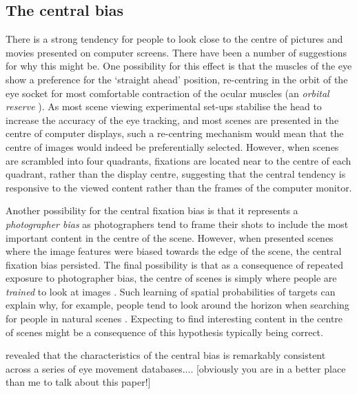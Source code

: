 \documentclass[a4paper, onecolumn, oneside, 11pt]{article}
\begin{document}
\subsection{The central bias}
There is a strong tendency for people to look close to the centre of pictures \citep{Tatler:2007hk,Tatler:2005bw, Canosa:2003tu, Clarke:2014km} and movies \citep{Tseng:2009jn} presented on computer screens. There have been a number of suggestions for why this might be. One possibility for this effect is that the muscles of the eye show a preference for the `straight ahead' position, re-centring in the orbit of the eye socket for most comfortable contraction of the ocular muscles (an \emph{orbital reserve} \citep{Fuller:1996bx}). As most scene viewing experimental set-ups stabilise the head to increase the accuracy of the eye tracking, and most scenes are presented in the centre of computer displays, such a re-centring mechanism would mean that the centre of images would indeed be preferentially selected. However, when scenes are scrambled into four quadrants, fixations are located near to the centre of each quadrant, rather than the display centre, suggesting that the central tendency is responsive to the viewed content \citep{Stainer:2013ce} rather than the frames of the computer monitor.

Another possibility for the central fixation bias is that it represents a \emph{photographer bias} as photographers tend to frame their shots to include the most important content in the centre of the scene. However, when \cite{Tatler:2007hk} presented scenes where the image features were biased towards the edge of the scene, the central fixation bias persisted. The final possibility is that as a consequence of repeated exposure to photographer bias, the centre of scenes is simply where people are \emph{trained} to look at images \citep{Parkhurst:2002vo}. Such learning of spatial probabilities of targets can explain why, for example, people tend to look around the horizon when searching for people in natural scenes \citep{Birmingham:2009hl, Torralba:2006iq, Ehinger:2009ji}. Expecting to find interesting content in the centre of scenes might be a consequence of this hypothesis typically being correct.

\cite{clarke-tatler2014} revealed that the characteristics of the central bias is remarkably consistent across a series of eye movement databases.... [obviously you are in a better place than me to talk about this paper!]
\end{document}
